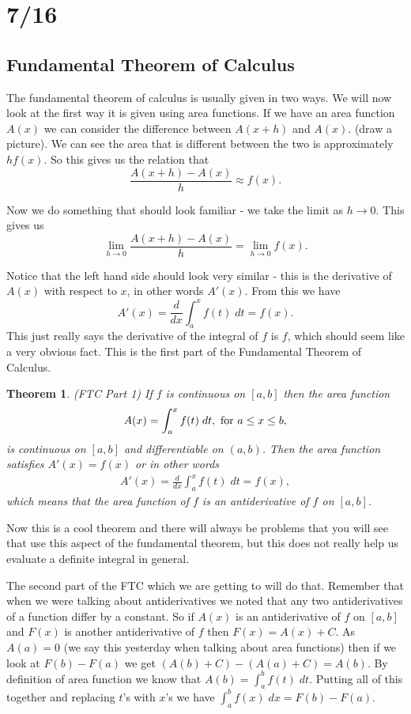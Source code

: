 \documentclass[12pt,reqno]{article}
\newtheorem{Theorem}{Theorem}
\theoremstyle{definition}
\begin{document}
\section{7/16}
\subsection{Fundamental Theorem of Calculus} 

The fundamental theorem of calculus is usually given in two ways. We will now look at the first way it is given using area functions. If we have an area function $A(x)$ we can consider the difference between $A(x + h)$ and $A(x)$. (draw a picture). We can see the area that is different between the two is approximately $h f(x)$. So this gives us the relation that $$\frac{A(x + h) - A(x)}{h} \approx f(x).$$

Now we do something that should look familiar - we take the limit as $h \to 0$. This gives us $$\lim_{h \to 0} \frac{A (x + h) - A(x)}{h} = \lim_{h \to 0} f(x).$$

Notice that the left hand side should look very similar - this is the derivative of $A(x)$ with respect to $x$, in other words $A'(x)$. From this we have $$A'(x) = \frac{d}{dx} \int_{a}^{x} f(t) \; dt = f(x).$$ This just really says the derivative of the integral of $f$ is $f$, which should seem like a very obvious fact. This is the first part of the Fundamental Theorem of Calculus. 
\begin{Theorem}
	(FTC Part 1) If $f$ is continuous on $[a, b]$ then the area function \begin{align*}
			A(x) = \int_{a}^{x} f(t) \; dt, \textnormal{ for } a \leq x \leq b,
	\end{align*}
	is continuous on $[a, b]$ and differentiable on $(a, b)$. Then the area function satisfies $A'(x) = f(x)$ or in other words \begin{align*}
		A'(x) = \frac{d}{dx} \int_{a}^{x} f(t) \; dt = f(x),
	\end{align*}
	which means that the area function of $f$ is an antiderivative of $f$ on $[a, b]$. 
\end{Theorem} 

Now this is a cool theorem and there will always be problems that you will see that use this aspect of the fundamental theorem, but this does not really help us evaluate a definite integral in general. 

The second part of the FTC which we are getting to will do that. Remember that when we were talking about antiderivatives we noted that any two antiderivatives of a function differ by a constant. So if $A(x)$ is an antiderivative of $f$ on $[a, b]$ and $F(x)$ is another antiderivative of $f$ then $F(x) = A(x) + C$. As $A(a) = 0$ (we say this yesterday when talking about area functions) then if we look at $F(b) - F(a)$ we get $(A(b) + C) - (A(a) + C) = A(b)$. By definition of area function we know that $A(b) = \int_{a}^{b} f(t) \; dt$. Putting all of this together and replacing $t$'s with $x$'s we have $\int_{a}^{b} f(x) \; dx = F(b) - F(a)$. 
\end{document}
